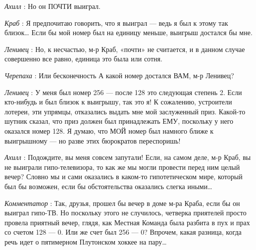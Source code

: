 \documentclass[../main.tex]{subfiles}
\begin{document}
\begin{dialogue}
\emph{Ахилл} : Но он ПОЧТИ выиграл.

\emph{Краб} : Я предпочитаю говорить, что я выиграл --- ведь я был к этому так близок\ldots{} Если бы мой номер был на единицу меньше, выигрыш достался бы мне.

\emph{Ленивец} : Но, к несчастью, м-р Краб, «почти» не считается, и в данном случае совершенно все равно, единица это была или сотня.

\emph{Черепаха} : Или бесконечность А какой номер достался ВАМ, м-р Ленивец?

\emph{Ленивец} : У меня был номер 256 --- после 128 это следующая степень 2. Если кто-нибудь и был близок к выигрышу, так это я! К сожалению, устроители лотереи, эти упрямцы, отказались выдать мне мой заслуженный приз. Какой-то шутник сказал, что приз должен был принадлежать ЕМУ, поскольку у него оказался номер 128. Я думаю, что МОЙ номер был намного ближе к выигрышному --- но разве этих бюрократов переспоришь!

\emph{Ахилл} : Подождите, вы меня совсем запутали! Если, на самом деле, м-р Краб, вы не выиграли гипо-телевизора, то как же мы могли провести перед ним целый вечер? Словно мы и сами оказались в каком-то гипотетическом мире, который был бы возможен, если бы обстоятельства оказались слегка иными\ldots{}

\emph{Комментатор} : Так, друзья, прошел бы вечер в доме м-ра Краба, если бы он выиграл гипо-ТВ. Но поскольку этого не случилось, четверка приятелей просто провела приятный вечер, глядя, как Местная Команда была разбита в пух и прах со счетом 128 --- 0. Или же счет был 256 --- 0? Впрочем, какая разница, когда речь идет о пятимерном Плутонском хоккее на пару\ldots{}

\end{dialogue}
\end{document}
